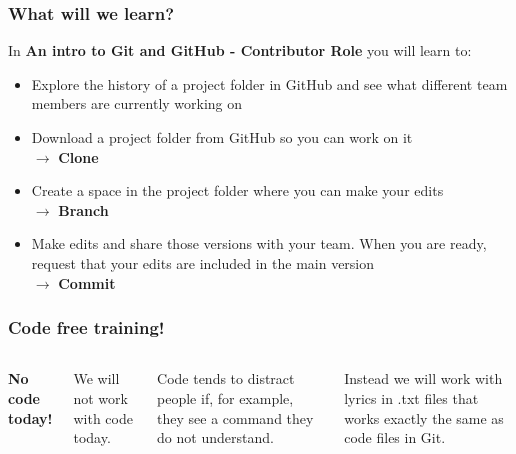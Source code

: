 \documentclass[aspectratio=169]{beamer} %
\begin{document}
\begin{frame}
\frametitle{What will we learn?}

	In \textbf{An intro to Git and GitHub - Contributor Role} you will learn to:

	\begin{itemize}
		\item Explore the history of a project folder in GitHub and see what different team members are currently working on
		\item <2-> Download a project folder from GitHub so you can work on it \\
		\hspace{5mm} $\rightarrow$ \textbf{Clone} 
		\item <3-> Create a space in the project folder where you can make your edits \\
		\hspace{5mm} $\rightarrow$ \textbf{Branch}
		\item <4-> Make edits and share those versions with your team. When you are ready, request that your edits are included in the main version \\
		\hspace{5mm} $\rightarrow$ \textbf{Commit}
	\end{itemize}

\end{frame}

\begin{frame}
\frametitle{Code free training!}

	\begin{columns}[c]


		\textbf{No code today!}

		\vspace{.5cm}

		We will not work with code today.

		\vspace{.25cm}

		Code tends to distract people if, for example, they see a command they do not understand.

		\vspace{.25cm}

		Instead we will work with lyrics in .txt files that works exactly the same as code files in Git.


	\end{columns}
\end{frame}
\end{document}
